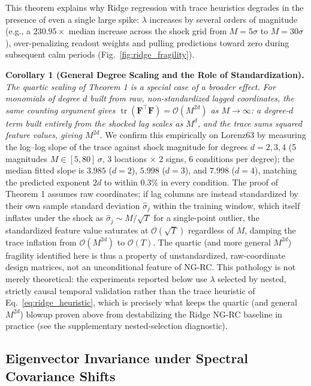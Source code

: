 \documentclass[aip,cha,reprint,amsmath,amssymb]{revtex4-2}
\begin{document}
This theorem explains why Ridge regression with trace heuristics degrades in the presence of even a single large spike: $\lambda$ increases by several orders of magnitude (e.g., a $230.95\times$ median increase across the shock grid from $M=5\sigma$ to $M=30\sigma$), over-penalizing readout weights and pulling predictions toward zero during subsequent calm periods (Fig.~\ref{fig:ridge_fragility}).

\textbf{Corollary 1 (General Degree Scaling and the Role of Standardization).} \emph{The quartic scaling of Theorem 1 is a special case of a broader effect. For monomials of degree $d$ built from raw, non-standardized lagged coordinates, the same counting argument gives $\operatorname{tr}(\mathbf{F}^\top\mathbf{F}) = \mathcal{O}(M^{2d})$ as $M \to \infty$: a degree-$d$ term built entirely from the shocked lag scales as $M^d$, and the trace sums squared feature values, giving $M^{2d}$.} We confirm this empirically on Lorenz63 by measuring the log--log slope of the trace against shock magnitude for degrees $d=2,3,4$ (5 magnitudes $M \in [5,80]\,\sigma$, 3 locations $\times$ 2 signs, 6 conditions per degree); the median fitted slope is $3.985$ ($d=2$), $5.998$ ($d=3$), and $7.998$ ($d=4$), matching the predicted exponent $2d$ to within $0.3\%$ in every condition. The proof of Theorem 1 assumes raw coordinates; if lag columns are instead standardized by their own sample standard deviation $\hat\sigma_j$ within the training window, which itself inflates under the shock as $\hat\sigma_j \sim M/\sqrt{T}$ for a single-point outlier, the standardized feature value saturates at $\mathcal{O}(\sqrt{T})$ regardless of $M$, damping the trace inflation from $\mathcal{O}(M^{2d})$ to $\mathcal{O}(T)$. The quartic (and more general $M^{2d}$) fragility identified here is thus a property of unstandardized, raw-coordinate design matrices, not an unconditional feature of NG-RC. This pathology is not merely theoretical: the experiments reported below use $\lambda$ selected by nested, strictly causal temporal validation rather than the trace heuristic of Eq.~\eqref{eq:ridge_heuristic}, which is precisely what keeps the quartic (and general $M^{2d}$) blowup proven above from destabilizing the Ridge NG-RC baseline in practice (see the supplementary nested-selection diagnostic).

\subsection{Eigenvector Invariance under Spectral Covariance Shifts}
\end{document}
